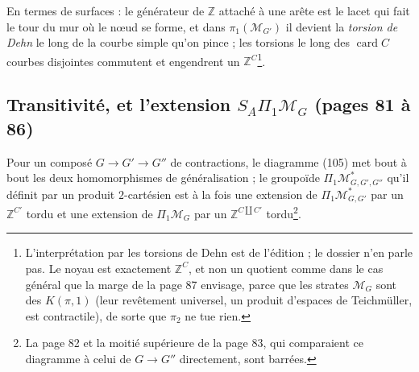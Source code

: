 \documentclass[11pt,a4paper]{article}
\begin{document}
En termes de surfaces : le générateur de $\mathbb{Z}$ attaché à une arête est le
lacet qui fait le tour du mur où le nœud se forme, et dans $\pi_1(\mathcal{M}_{G'})$
il devient la \emph{torsion de Dehn} le long de la courbe simple qu'on pince ; les
torsions le long des $\operatorname{card} C$ courbes disjointes commutent et
engendrent un $\mathbb{Z}^C$\footnote{L'interprétation par les torsions de Dehn
est de l'édition ; le dossier n'en parle pas. Le noyau est exactement
$\mathbb{Z}^C$, et non un quotient comme dans le cas général que la marge de la
page 87 envisage, parce que les strates $\mathcal{M}_G$ sont des $K(\pi, 1)$ (leur
revêtement universel, un produit d'espaces de Teichmüller, est contractile), de
sorte que $\pi_2$ ne tue rien.}.

\subsection*{Transitivité, et l'extension $S_A\Pi_1\mathcal{M}_G$ (pages 81 à 86)}

Pour un composé $G \to G' \to G''$ de contractions, le diagramme (105) met bout à
bout les deux homomorphismes de généralisation ; le groupoïde $\Pi_1
\mathcal{M}^{*}_{G,G',G''}$ qu'il définit par un produit $2$-cartésien est à la
fois une extension de $\Pi_1 \mathcal{M}^{*}_{G,G'}$ par un $\mathbb{Z}^{C'}$
tordu et une extension de $\Pi_1 \mathcal{M}_G$ par un $\mathbb{Z}^{C \amalg C'}$
tordu\footnote{La page 82 et la moitié supérieure de la page 83, qui comparaient
ce diagramme à celui de $G \to G''$ directement, sont barrées.}.
\end{document}

